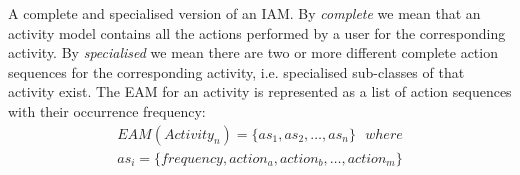 \begin{defn}
 A complete and specialised version of an IAM. By \textit{complete} we mean that an activity model contains all the actions performed by a user for the corresponding activity. By \textit{specialised} we mean there are two or more different complete action sequences for the corresponding activity, i.e. specialised sub-classes of that activity exist. The EAM for an activity is represented as a list of action sequences with their occurrence frequency:
\begin{equation}
 \begin{split}
 EAM(Activity_n) = \{as_1, as_2, \ldots , as_n\} \ \ \ where \\
 as_i = \{frequency, action_a, action_b, \ldots, action_m\}
 \end{split}
 \label{eq-eam}
\end{equation}
\end{defn}